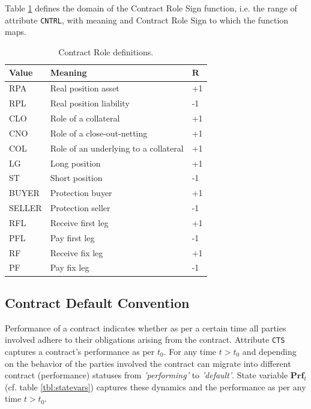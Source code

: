 \documentclass[9pt,oneside]{amsart}
\newcommand{\svar}[2]{\textbf{#1}_{#2}}
\newcommand{\attr}[1]{\texttt{#1}}
\begin{document}
\begin{multicols}{2}
Table \ref{tbl:cntrl} defines the domain of the Contract Role Sign function, i.e. the range of attribute \attr{CNTRL}, with meaning and Contract Role Sign to which the function maps.




\begin{table}[H]
	\centering
	\begin{tabular}{| p{0.5in}p{1.5in}p{0.2in} |}
	\hline
	\textbf{Value} & \textbf{Meaning} & $\textbf{R}$ \\
	\hline
	RPA & Real position asset & +1 \\
	\hline
	RPL & Real position liability & -1 \\
	\hline
	CLO & Role of a collateral & +1 \\
	\hline
	CNO & Role of a close-out-netting & +1 \\
	\hline
	COL & Role of an underlying to a collateral & +1 \\
	\hline
	LG & Long position & +1 \\
	\hline
	ST & Short position & -1 \\
	\hline
	BUYER & Protection buyer & +1 \\
	\hline
	SELLER & Protection seller & -1 \\
	\hline
	RFL & Receive first leg & +1 \\
	\hline
	PFL & Pay first leg & -1 \\
	\hline
	RF & Receive fix leg & +1 \\
	\hline
	PF & Pay fix leg & -1 \\
	\hline
	\end{tabular}
	\caption{Contract Role definitions.}
	\label{tbl:cntrl}
\end{table}




\subsection{Contract Default Convention}

Performance of a contract indicates whether as per a certain time all parties involved adhere to their obligations arising from the contract. Attribute \attr{CTS} captures a contract's performance as per $t_0$. For any time $t>t_0$ and depending on the behavior of the parties involved the contract can migrate into different contract (performance) statuses from \textit{'performing'} to \textit{'default'}. State variable $\svar{Prf}{t}$ (cf. table \ref{tbl:statevars}) captures these dynamics and the performance as per any time $t>t_0$.\\


\end{multicols}
\end{document}
